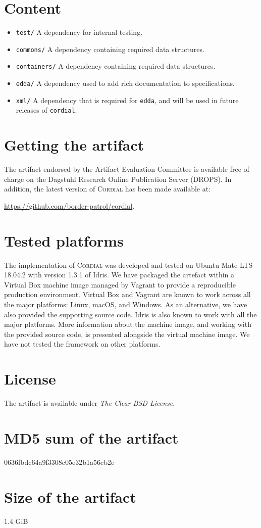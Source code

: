 \documentclass[a4paper,UKenglish]{darts-v2019}
\newenvironment{content}{\section{Content}}{}
\newenvironment{getting}{\section{Getting the artifact} The artifact
endorsed by the Artifact Evaluation Committee is available free of
charge on the Dagstuhl Research Online Publication Server (DROPS).}{}
\newenvironment{platforms}{\section{Tested platforms}}{}
\newcommand{\license}[1]{{\section{License}#1}}
\newcommand{\mdsum}[1]{{\section{MD5 sum of the artifact}#1}}
\newcommand{\artifactsize}[1]{{\section{Size of the artifact}#1}}
\newcommand{\theFramework}{\textsc{Cordial}}
\begin{document}
\begin{content}
\begin{itemize}
\begin{itemize}
  \item
    \texttt{test/}
    \newline
    A dependency for internal testing.
  \item
    \texttt{commons/}
    \newline
    A dependency containing required data structures.
  \item
    \texttt{containers/}
    \newline
    A dependency containing required data structures.
  \item
    \texttt{edda/}
    \newline
    A dependency used to add rich documentation to specifications.
  \item
    \texttt{xml/}
    \newline
    A dependency that is required for \texttt{edda}, and will be used in future releases of \texttt{cordial}.
  \end{itemize}
\end{itemize}
\end{content}

\begin{getting}
In addition, the latest version of \theFramework{} has been made available at:
\begin{center}
\url{https://github.com/border-patrol/cordial}.
\end{center}
\end{getting}


\begin{platforms}
  The implementation of \theFramework{} was developed and tested on Ubuntu Mate LTS 18.04.2 with version 1.3.1 of Idris.
  We have packaged the artefact within a Virtual Box machine image managed by Vagrant to provide a reproducible production environment.
  Virtual Box and Vagrant are known to work across all the major platforms: Linux, macOS, and Windows.
  As an alternative, we have also provided the supporting source code.
  Idris is also known to work with all the major platforms.
  More information about the machine image, and working with the provided source code, is presented alongside the virtual machine image.
  We have not tested the framework on other platforms.
  \end{platforms}

\license{The artifact is available under \emph{The Clear BSD License}.}

\mdsum{0636fbdc64a9f3308c05e32b1a56eb2e}

\artifactsize{1.4 GiB}


\end{document}

